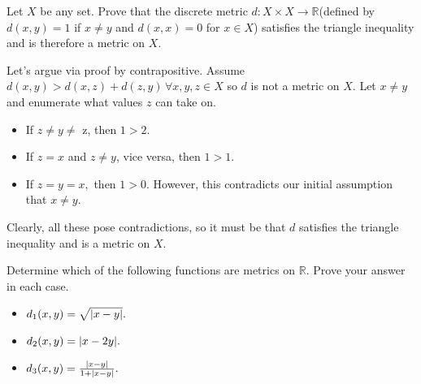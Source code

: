 \documentclass[12pt,letterpaper,boxed]{hmcpset}
\DeclarePairedDelimiter\abs{\lvert}{\rvert}
\begin{document}
\begin{problem}[Exercise 2.3.]
Let $X$ be any set. Prove that the discrete metric $d : X \times X \rightarrow \mathbb{R}$(defined by $d(x,y)=1$ if $x \neq y$ and $d(x, x) = 0$ for $x \in X$) satisfies the triangle inequality and is therefore a metric on $X$.
\end{problem}

\begin{solution}
Let's argue via proof by contrapositive. Assume $d(x, y) > d(x, z) + d(z, y) \, \forall x, y, z \in X$ so $d$ is not a metric on $X.$ Let $x \neq y$ and enumerate what values $z$ can take on. 
\vspace{-2mm}
\begin{itemize}
	\itemsep0em
	\item If $z \neq y \neq$ z, then $1 > 2.$
	\item If $z = x$ and $z \neq y$, vice versa, then $1 > 1.$
	\item If $z = y = x,$ then $1 > 0.$ However, this contradicts our initial assumption that $x \neq y.$
\end{itemize}
Clearly, all these pose contradictions, so it must be that $d$ satisfies the triangle inequality and is a metric on $X$.

\end{solution}

\begin{problem}[Exercise 2.4.]
Determine which of the following functions are metrics on $\mathbb{R}$. Prove your answer in each case.
\vspace{-2mm}
\begin{itemize}
	\itemsep0em
	\item $d_1(x,y)=\sqrt{\abs{x - y}}.$
	\item $d_2(x,y)=\abs{x - 2y}.$
	\item $d_3(x,y)=\frac{\abs{x - y}}{1 + \abs{x - y}}.$
\end{itemize}
\end{problem}
\begin{solution}

\end{solution}
\end{document}
